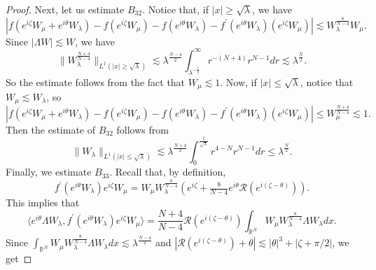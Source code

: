 \documentclass[a4paper,two-side,10pt]{amsart}
\newcommand{\R}{\mathbb{R}}
\numberwithin{equation}{section}
\begin{document}
\begin{proof}
Next, let us estimate $B_{32}$. Notice that, if
 $|x|\geq \sqrt{\lambda}$, we have
$$|  f(e^{i\zeta} W_\mu +e^{i\theta} W_\lambda ) - f(e^{i\zeta} W_\mu) -f(e^{i\theta} W_\lambda) - f^\prime (e^{i\theta} W_\lambda) (e^{i\zeta} W_\mu)|\lesssim W_\lambda^{\frac{8}{N-4}} W_\mu.$$
Since $|\Lambda W|\lesssim W$, we have
$$\|W_\lambda^{\frac{N+4}{N-4}}\|_{L^1 (|x|\geq \sqrt{\lambda})} \lesssim \lambda^{\frac{N-4}{2}} \int_{\lambda^{-\frac{1}{2}}}^\infty r^{-(N+4) } r^{N-1}dr \lesssim \lambda^{\frac{N}{2}}. $$
So the estimate follows from the fact that $W_\mu \lesssim 1$. Now, if $|x|\leq \sqrt{\lambda}$, notice that $W_\mu \lesssim W_\lambda$, so
$$|  f(e^{i\zeta} W_\mu +e^{i\theta} W_\lambda ) - f(e^{i\zeta} W_\mu) -f(e^{i\theta} W_\lambda) - f^\prime (e^{i\theta} W_\lambda) (e^{i\zeta} W_\mu)|\leq W_\mu^{\frac{N+4}{N-4}}\lesssim 1.$$
Then the estimate of $B_{32}$ follows from
$$\|W_\lambda\|_{L^1 (|x|\leq \sqrt{\lambda})} \lesssim \lambda^{\frac{N+4}{2}} \int_0^{\frac{1}{\sqrt{\lambda}}} r^{4-N} r^{N-1} dr \leq \lambda^{\frac{N}{2}}.$$
Finally, we estimate $B_{33}$.
Recall that, by definition,
$$ f^\prime (e^{i\theta} W_\lambda) e^{i\zeta} W_\mu = W_\mu W_\lambda^{\frac{8}{N-4}} \left(e^{i\zeta} + \tfrac{8}{N-4} e^{i\theta} \mathcal{R} (e^{i(\zeta -\theta)})\right).$$
This implies that
$$\langle e^{i\theta} \Lambda W_\lambda , f^\prime (e^{i\theta} W_\lambda) e^{i\zeta} W_\mu\rangle = \frac{N+4}{N-4} \mathcal{R} \left(e^{i(\zeta -\theta)}\right) \int_{\R^N} W_\mu W_\lambda^{\frac{8}{N-4}} \Lambda W_\lambda dx.$$
 Since $ \int_{\R^N} W_\mu W_\lambda^{\frac{8}{N-4}} \Lambda W_\lambda dx \lesssim \lambda^{\frac{N-4}{2}}$ and $|\mathcal{R}(e^{i(\zeta -\theta)}) +\theta|\lesssim |\theta|^3 + |\zeta +\pi /2|$, we get

\end{proof}
\end{document}
